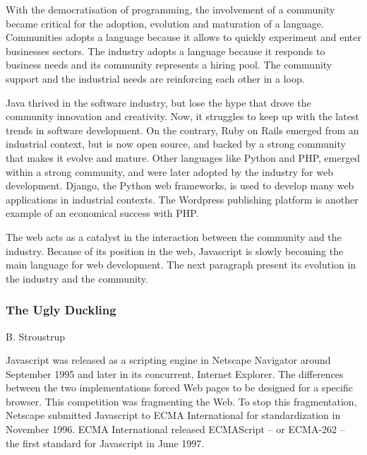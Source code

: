 With the democratisation of programming, the involvement of a community became critical for the adoption, evolution and maturation of a language.
Communities adopts a language because it allows to quickly experiment and enter businesses sectors.
The industry adopts a language because it responds to business needs and its community represents a hiring pool.
The community support and the industrial needs are reinforcing each other in a loop.

Java thrived in the software industry, but lose the hype that drove the community innovation and creativity.
Now, it struggles to keep up with the latest trends in software development.
On the contrary, Ruby on Rails emerged from an industrial context, but is now open source, and backed by a strong community that makes it evolve and mature.
Other languages like Python and PHP, emerged within a strong community, and were later adopted by the industry for web development.
Django, the Python web frameworks, is used to develop many web applications in industrial contexts.
The Wordpress publishing platform is another example of an economical success with PHP.

The web acts as a catalyst in the interaction between the community and the industry.
Because of its position in the web, Javascript is slowly becoming the main language for web development.
The next paragraph present its evolution in the industry and the community.

\subsubsection{The Ugly Duckling}


%
{B. Stroustrup}


Javascript was released as a scripting engine in Netscape Navigator around September 1995 and later in its concurrent, Internet Explorer.
The differences between the two implementations forced Web pages to be designed for a specific browser.
This competition was fragmenting the Web.
To stop this fragmentation, Netscape submitted Javascript to ECMA International for standardization in November 1996.
ECMA International released  ECMAScript -- or ECMA-262 -- the first standard for Javascript in June 1997. %

